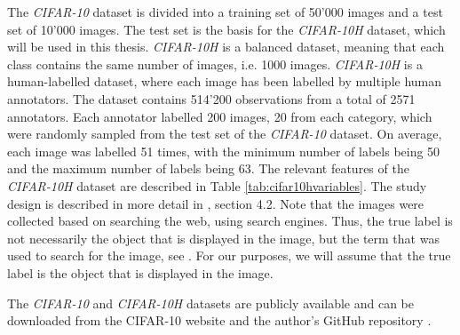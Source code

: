 The \textit{CIFAR-10} dataset is divided into a training set of 50'000 images
and a test set of 10'000 images. The test set is the basis for the
\textit{CIFAR-10H} dataset, which will be used in this thesis.
\textit{CIFAR-10H} is a balanced dataset, meaning that each class contains the
same number of images, i.e. 1000 images. \textit{CIFAR-10H} is a human-labelled
dataset, where each image has been labelled by multiple human annotators. The
dataset contains 514'200 observations from a total of 2571 annotators. Each
annotator labelled 200 images, 20 from each category, which were randomly
sampled from the test set of the \textit{CIFAR-10} dataset. On average, each
image was labelled 51 times, with the minimum number of labels being 50 and the
maximum number of labels being 63. The relevant features of the
\textit{CIFAR-10H} dataset are described in Table \ref{tab:cifar10hvariables}.
The study design is described in more detail in
\cite{petersonHumanUncertaintyMakes2019}, section 4.2. Note that the images
were collected based on searching the web, using search engines. Thus, the true
label is not necessarily the object that is displayed in the image, but the term
that was used to search for the image, see \cite{torralba80MillionTiny2008}. For
our purposes, we will assume that the true label is the object that is displayed
in the image.
\bigskip

The \textit{CIFAR-10} and \textit{CIFAR-10H} datasets are publicly available and
can be downloaded from the CIFAR-10 website \cite{CIFAR10CIFAR100Datasetsb} and the
author's GitHub repository \cite{JcpetersonCifar10hOriginal}.

